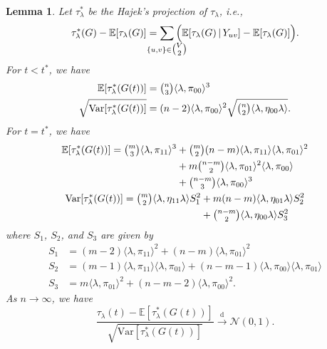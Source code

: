 \documentclass[10pt,journal,compsoc]{IEEEtran}
\newtheorem{lemma}[theorem]{Lemma}
\theoremstyle{definition}
\def\clap#1{\hbox to 0pt{\hss#1\hss}}
\def\mathclap{\mathpalette\mathclapinternal}
\def\mathclapinternal#1#2{%
\clap{$\mathsurround=0pt#1{#2}$}%
}
\begin{document}
\begin{lemma}
  \label{lem:3}
  Let $\tau_{\lambda}^{*}$ be the Hajek's projection of $\tau_{\lambda}$, i.e.,
\begin{equation}
  \label{eq:46}
  \tau_{\lambda}^{*}(G) - \mathbb{E}[\tau_{\lambda}(G)] =
  \sum_{\mathclap{\{u,v\} \in \tbinom{V}{2}}} \, \Bigl(\mathbb{E}[
  \tau_{\lambda}(G) \, \lvert \, Y_{uv}] -
  \mathbb{E}[\tau_{\lambda}(G)]\Bigr).
\end{equation}
For $t < t^{*}$, we have
\begin{align*}
  \mathbb{E}[\tau_{\lambda}^{*}(G(t))] &= \tbinom{n}{3} \langle 
  \lambda, \pi_{00} \rangle^{3} \\
  \sqrt{\mathrm{Var}[\tau_{\lambda}^{*}(G(t))]} &= (n-2) \langle \lambda,
  \pi_{00} \rangle^{2} \sqrt{\tbinom{n}{2} \langle \lambda, \eta_{00}
  \lambda \rangle}.
\end{align*}
For $t = t^{*}$, we have
  \begin{gather*}
    \label{eq:42}
    \begin{split}
    \mathbb{E}[\tau_{\lambda}^{*}(G(t))] = \tbinom{m}{3}
    \langle \lambda, \pi_{11} \rangle^{3} &+
    \tbinom{m}{2}(n-m) \langle \lambda, \pi_{11} \rangle \langle
    \lambda, \pi_{01} \rangle^{2} \\ &+ m \tbinom{n-m}{2} \langle \lambda,
    \pi_{01} \rangle^{2} \langle \lambda, \pi_{00} \rangle \\ &+
    \tbinom{n-m}{3} \langle \lambda, \pi_{00} \rangle^{3}
    \end{split} \\
    \begin{split}
    \mathrm{Var}[\tau_{\lambda}^{*}(G(t))] = \tbinom{m}{2} \langle \lambda, \eta_{11} \lambda
    \rangle S_1^2  
    &+ m(n-m) \langle \lambda, \eta_{01} \lambda \rangle S_2^2  \\
    &+ \tbinom{n-m}{2} \langle \lambda, \eta_{00} \lambda \rangle
    S_3^2
    \end{split}
  \end{gather*}
  where $S_1$, $S_2$, and $S_3$ are given by
\begin{align*}
    S_1 &= (m-2) \langle \lambda, \pi_{11} \rangle^{2} + (n-m)
    \langle \lambda, \pi_{01} \rangle^{2} \\ 
    S_2 &= (m-1)
    \langle \lambda, \pi_{11} \rangle \langle \lambda, \pi_{01}
    \rangle + (n-m-1) \langle \lambda, \pi_{00} \rangle \langle
    \lambda, \pi_{01} \rangle \\
    S_3 &= m \langle \lambda, \pi_{01} \rangle^{2} + (n-m-2) \langle
    \lambda, \pi_{00} \rangle^{2}.
    \end{align*}
  As $n \rightarrow \infty$, we have
  \begin{equation}
    \label{eq:49}
    \frac{\tau_{\lambda}(t) -
      \mathbb{E}[\tau_{\lambda}^{*}(G(t))]}{\sqrt{\mathrm{Var}[\tau_{\lambda}^{*}(G(t))]}}
\overset{\mathrm{d}}{\longrightarrow}  \mathcal{N}(0,1).
  \end{equation}
\end{lemma}
\end{document}
